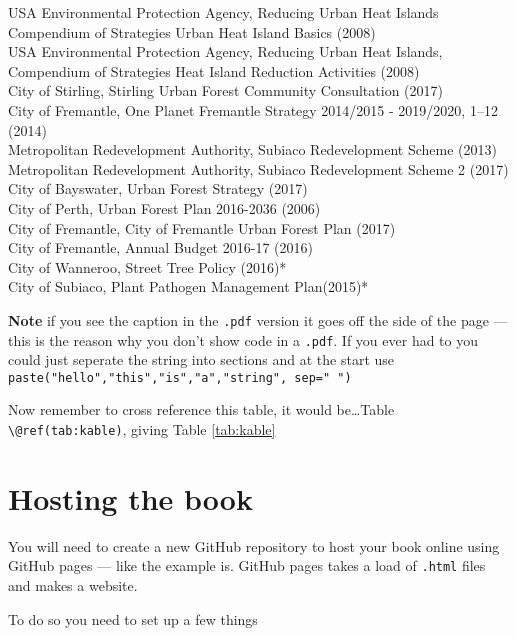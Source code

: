 \documentclass[
  12pt,
  oneside]{book}
\begin{document}
\begin{longtabu}
USA Environmental Protection Agency, Reducing Urban Heat Islands Compendium of Strategies Urban Heat Island Basics (2008)\\
\addlinespace
USA Environmental Protection Agency, Reducing Urban Heat Islands, Compendium of Strategies Heat Island Reduction Activities (2008)\\
City of Stirling, Stirling Urban Forest Community Consultation (2017)\\
City of Fremantle, One Planet Fremantle Strategy 2014/2015 - 2019/2020, 1–12 (2014)\\
Metropolitan Redevelopment Authority, Subiaco Redevelopment Scheme (2013)\\
Metropolitan Redevelopment Authority, Subiaco Redevelopment Scheme 2 (2017)\\
\addlinespace
City of Bayswater, Urban Forest Strategy (2017)\\
City of Perth, Urban Forest Plan 2016-2036 (2006)\\
City of Fremantle, City of Fremantle Urban Forest Plan (2017)\\
City of Fremantle, Annual Budget 2016-17 (2016)\\
City of Wanneroo, Street Tree Policy (2016)*\\
\addlinespace
City of Subiaco, Plant Pathogen Management Plan(2015)*\\
\bottomrule
\end{longtabu}

\textbf{Note} if you see the caption in the \texttt{.pdf} version it goes off the side of the page --- this is the reason why you don't show code in a \texttt{.pdf}. If you ever had to you could just seperate the string into sections and at the start use \texttt{paste("hello","this","is","a","string",\ sep="\ ")}

Now remember to cross reference this table, it would be\ldots Table \texttt{\textbackslash{}@ref(tab:kable)}, giving Table \ref{tab:kable}

\hypertarget{hosting-the-book}{%
\section{Hosting the book}\label{hosting-the-book}}

You will need to create a new GitHub repository to host your book online using GitHub pages --- like the example is. GitHub pages takes a load of \texttt{.html} files and makes a website.

To do so you need to set up a few things
\end{document}
